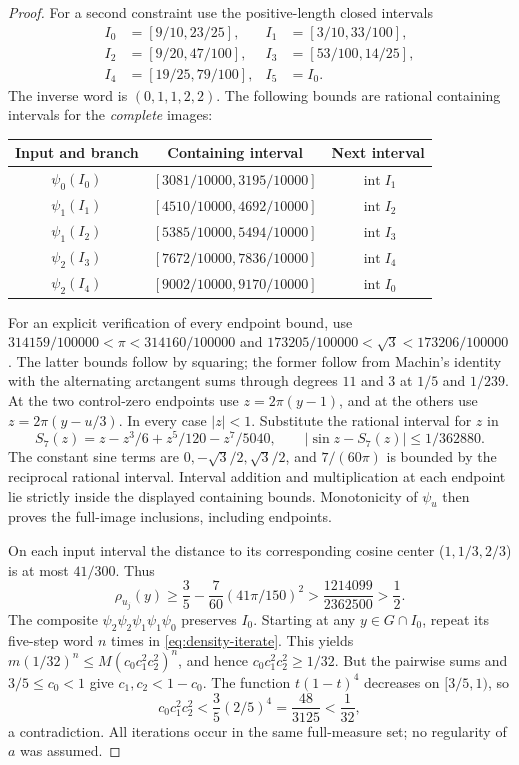 \documentclass[11pt,reqno]{amsart}
\numberwithin{equation}{section}
\theoremstyle{definition}
\newcommand{\intr}{\operatorname{int}}
\begin{document}
\begin{proof}
For a second constraint use the positive-length closed intervals
\begin{align*}
 I_0&=[9/10,23/25],& I_1&=[3/10,33/100],\\
 I_2&=[9/20,47/100],& I_3&=[53/100,14/25],\\
 I_4&=[19/25,79/100],& I_5&=I_0.
\end{align*}
The inverse word is $(0,1,1,2,2)$. The following bounds are
rational containing intervals for the \emph{complete} images:
\begin{center}
\begin{tabular}{ccc}
\toprule
Input and branch&Containing interval&Next interval\\
\midrule
$\psi_0(I_0)$&$[3081/10000,3195/10000]$&$\intr I_1$\\
$\psi_1(I_1)$&$[4510/10000,4692/10000]$&$\intr I_2$\\
$\psi_1(I_2)$&$[5385/10000,5494/10000]$&$\intr I_3$\\
$\psi_2(I_3)$&$[7672/10000,7836/10000]$&$\intr I_4$\\
$\psi_2(I_4)$&$[9002/10000,9170/10000]$&$\intr I_0$\\
\bottomrule
\end{tabular}
\end{center}
For an explicit verification of every endpoint bound, use
$314159/100000<\pi<314160/100000$ and
$173205/100000<\sqrt3<173206/100000$.
The latter bounds follow by squaring; the former follow from
Machin's identity with the alternating arctangent sums through
degrees $11$ and $3$ at $1/5$ and $1/239$.
At the two control-zero endpoints use $z=2\pi(y-1)$, and at
the others use $z=2\pi(y-u/3)$. In every case $|z|<1$.
Substitute the rational interval for $z$ in
\[
 S_7(z)=z-z^3/6+z^5/120-z^7/5040,\qquad
 |\sin z-S_7(z)|\le1/362880.
\]
The constant sine terms are $0,-\sqrt3/2,\sqrt3/2$, and
$7/(60\pi)$ is bounded by the reciprocal rational interval.
Interval addition and multiplication at each endpoint lie strictly
inside the displayed containing bounds. Monotonicity of $\psi_u$
then proves the full-image inclusions, including endpoints.

On each input interval the distance to its corresponding cosine
center ($1,1/3,2/3$) is at most $41/300$. Thus
\[
 \rho_{u_j}(y)\ge\frac35-\frac7{60}(41\pi/150)^2
 >\frac{1214099}{2362500}>\frac12.
\]
The composite $\psi_2\psi_2\psi_1\psi_1\psi_0$ preserves
$I_0$. Starting at any $y\in G\cap I_0$, repeat its five-step
word $n$ times in \eqref{eq:density-iterate}. This yields
$m(1/32)^n\le M(c_0c_1^2c_2^2)^n$, and hence
$c_0c_1^2c_2^2\ge1/32$. But the pairwise sums and
$3/5\le c_0<1$ give $c_1,c_2<1-c_0$. The function
$t(1-t)^4$ decreases on $[3/5,1)$, so
\[
 c_0c_1^2c_2^2<\frac35(2/5)^4=\frac{48}{3125}<\frac1{32},
\]
a contradiction. All iterations occur in the same full-measure
set; no regularity of $a$ was assumed.
\end{proof}
\end{document}
